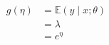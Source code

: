 \begin{answer}
    $$
        \begin{aligned}
            g(\eta) &= \mathbb{E}(y \mid x;\theta)\\
            &= \lambda \\
            &= e^{\eta} \\
        \end{aligned}
    $$
\end{answer}
